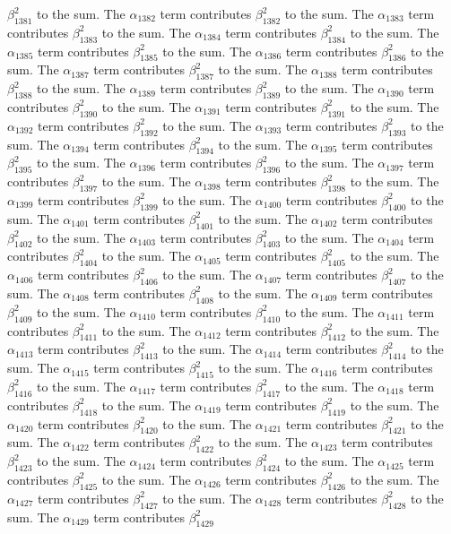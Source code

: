 \begin{lemma}
$\beta_{1381}^{2}$ to the sum. The $\alpha_{1382}$ term contributes $\beta_{1382}^{2}$ to the sum. The $\alpha_{1383}$ term contributes $\beta_{1383}^{2}$ to the sum. The $\alpha_{1384}$ term contributes $\beta_{1384}^{2}$ to the sum. The $\alpha_{1385}$ term contributes $\beta_{1385}^{2}$ to the sum. The $\alpha_{1386}$ term contributes $\beta_{1386}^{2}$ to the sum. The $\alpha_{1387}$ term contributes $\beta_{1387}^{2}$ to the sum. The $\alpha_{1388}$ term contributes $\beta_{1388}^{2}$ to the sum. The $\alpha_{1389}$ term contributes $\beta_{1389}^{2}$ to the sum. The $\alpha_{1390}$ term contributes $\beta_{1390}^{2}$ to the sum. The $\alpha_{1391}$ term contributes $\beta_{1391}^{2}$ to the sum. The $\alpha_{1392}$ term contributes $\beta_{1392}^{2}$ to the sum. The $\alpha_{1393}$ term contributes $\beta_{1393}^{2}$ to the sum. The $\alpha_{1394}$ term contributes $\beta_{1394}^{2}$ to the sum. The $\alpha_{1395}$ term contributes $\beta_{1395}^{2}$ to the sum. The $\alpha_{1396}$ term contributes $\beta_{1396}^{2}$ to the sum. The $\alpha_{1397}$ term contributes $\beta_{1397}^{2}$ to the sum. The $\alpha_{1398}$ term contributes $\beta_{1398}^{2}$ to the sum. The $\alpha_{1399}$ term contributes $\beta_{1399}^{2}$ to the sum. The $\alpha_{1400}$ term contributes $\beta_{1400}^{2}$ to the sum. The $\alpha_{1401}$ term contributes $\beta_{1401}^{2}$ to the sum. The $\alpha_{1402}$ term contributes $\beta_{1402}^{2}$ to the sum. The $\alpha_{1403}$ term contributes $\beta_{1403}^{2}$ to the sum. The $\alpha_{1404}$ term contributes $\beta_{1404}^{2}$ to the sum. The $\alpha_{1405}$ term contributes $\beta_{1405}^{2}$ to the sum. The $\alpha_{1406}$ term contributes $\beta_{1406}^{2}$ to the sum. The $\alpha_{1407}$ term contributes $\beta_{1407}^{2}$ to the sum. The $\alpha_{1408}$ term contributes $\beta_{1408}^{2}$ to the sum. The $\alpha_{1409}$ term contributes $\beta_{1409}^{2}$ to the sum. The $\alpha_{1410}$ term contributes $\beta_{1410}^{2}$ to the sum. The $\alpha_{1411}$ term contributes $\beta_{1411}^{2}$ to the sum. The $\alpha_{1412}$ term contributes $\beta_{1412}^{2}$ to the sum. The $\alpha_{1413}$ term contributes $\beta_{1413}^{2}$ to the sum. The $\alpha_{1414}$ term contributes $\beta_{1414}^{2}$ to the sum. The $\alpha_{1415}$ term contributes $\beta_{1415}^{2}$ to the sum. The $\alpha_{1416}$ term contributes $\beta_{1416}^{2}$ to the sum. The $\alpha_{1417}$ term contributes $\beta_{1417}^{2}$ to the sum. The $\alpha_{1418}$ term contributes $\beta_{1418}^{2}$ to the sum. The $\alpha_{1419}$ term contributes $\beta_{1419}^{2}$ to the sum. The $\alpha_{1420}$ term contributes $\beta_{1420}^{2}$ to the sum. The $\alpha_{1421}$ term contributes $\beta_{1421}^{2}$ to the sum. The $\alpha_{1422}$ term contributes $\beta_{1422}^{2}$ to the sum. The $\alpha_{1423}$ term contributes $\beta_{1423}^{2}$ to the sum. The $\alpha_{1424}$ term contributes $\beta_{1424}^{2}$ to the sum. The $\alpha_{1425}$ term contributes $\beta_{1425}^{2}$ to the sum. The $\alpha_{1426}$ term contributes $\beta_{1426}^{2}$ to the sum. The $\alpha_{1427}$ term contributes $\beta_{1427}^{2}$ to the sum. The $\alpha_{1428}$ term contributes $\beta_{1428}^{2}$ to the sum. The $\alpha_{1429}$ term contributes $\beta_{1429}^{2}$ 
\end{lemma}
